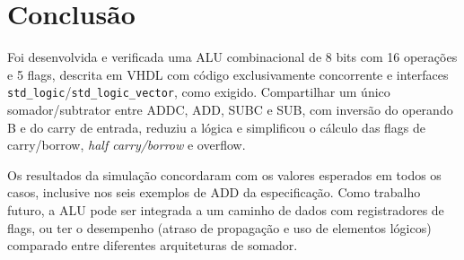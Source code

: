 \chapter{Conclusão}
\label{cap:conclusao}

Foi desenvolvida e verificada uma ALU combinacional de 8 bits com 16 operações e 5 flags, descrita em VHDL com código exclusivamente concorrente e interfaces \break \texttt{std\_logic}/\texttt{std\_logic\_vector}, como exigido. Compartilhar um único somador/subtrator entre ADDC, ADD, SUBC e SUB, com inversão do operando B e do carry de entrada, reduziu a lógica e simplificou o cálculo das flags de carry/borrow, \textit{half carry/borrow} e overflow.

Os resultados da simulação concordaram com os valores esperados em todos os casos, inclusive nos seis exemplos de ADD da especificação. Como trabalho futuro, a ALU pode ser integrada a um caminho de dados com registradores de flags, ou ter o desempenho (atraso de propagação e uso de elementos lógicos) comparado entre diferentes arquiteturas de somador.
